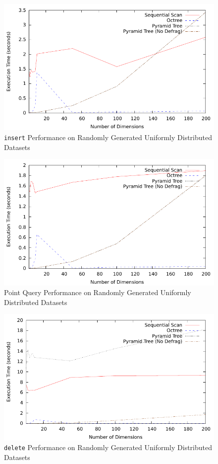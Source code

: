 \begin{figure}
	\centering
	\includegraphics[scale=0.8]{../results/end_of_iteration1/all_insert_randuniform.pdf}
	\caption{\texttt{insert} Performance on Randomly Generated Uniformly Distributed Datasets}
	\label{fig:perf-1-allinsert}
\end{figure}

\begin{figure}
	\centering
	\includegraphics[scale=0.8]{../results/end_of_iteration1/all_pquery_randuniform.pdf}
	\caption{Point Query Performance on Randomly Generated Uniformly Distributed Datasets}
	\label{fig:perf-1-allpquery}
\end{figure}

\begin{figure}
	\centering
	\includegraphics[scale=0.8]{../results/end_of_iteration1/all_delete_randuniform.pdf}
	\caption{\texttt{delete} Performance on Randomly Generated Uniformly Distributed Datasets}
	\label{fig:perf-1-alldelete}
\end{figure}

